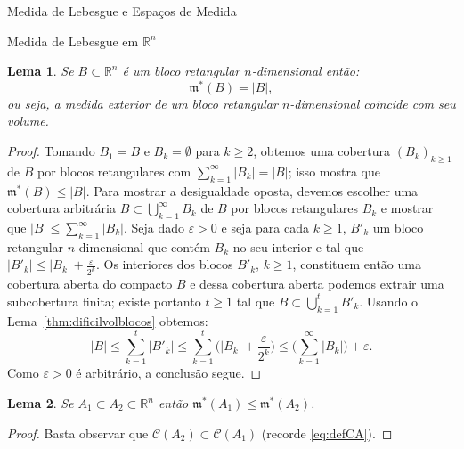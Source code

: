 \documentclass[oneside,final,11pt]{amsbook}
\newcommand{\R}{\mathds R}
\newcommand{\leb}{\mathfrak m}
\theoremstyle{remark}\newtheorem{exercise}{Exercício}[chapter]
\theoremstyle{remark}\newtheorem{*exercise}[exercise]{\hbox to 0pt{\hskip 0pt minus 1fil*}Exercício}
\theoremstyle{definition}\newtheorem{exdefin}{Definição}[chapter]
\theoremstyle{plain}\newtheorem{teo}{Teorema}[section]
\theoremstyle{plain}\newtheorem{lem}[teo]{Lema}
\theoremstyle{plain}\newtheorem{prop}[teo]{Proposição}
\theoremstyle{plain}\newtheorem{cor}[teo]{Corolário}
\theoremstyle{definition}\newtheorem{defin}[teo]{Definição}
\theoremstyle{remark}\newtheorem{rem}[teo]{Observação}
\theoremstyle{definition}\newtheorem{notation}[teo]{Notação}
\theoremstyle{definition}\newtheorem{convention}[teo]{Convenção}
\theoremstyle{definition}\newtheorem{example}[teo]{Exemplo}
\numberwithin{section}{chapter}
\numberwithin{equation}{section}
\begin{document}
\begin{chapter}{Medida de Lebesgue e Espaços de Medida}
\begin{section}[Medida de Lebesgue em $\R^n$]{Medida de Lebesgue em ${\R^n}$}
\begin{lem}\label{thm:medidabloco}
Se $B\subset\R^n$ é um bloco retangular $n$-dimensional então:
\[\leb^*(B)=\vert B\vert,\]
ou seja, a medida exterior de um bloco retangular $n$-dimensional coincide com seu volume.
\end{lem}
\begin{proof}
Tomando $B_1=B$ e $B_k=\emptyset$ para $k\ge2$, obtemos uma cobertura $(B_k)_{k\ge1}$ de $B$ por blocos retangulares
com $\sum_{k=1}^\infty\vert B_k\vert=\vert B\vert$;
isso mostra que $\leb^*(B)\le\vert B\vert$. Para mostrar a desigualdade oposta, devemos escolher uma cobertura arbitrária
$B\subset\bigcup_{k=1}^\infty B_k$ de $B$ por blocos retangulares $B_k$ e mostrar que $\vert B\vert\le\sum_{k=1}^\infty\vert B_k\vert$.
Seja dado $\varepsilon>0$ e seja para cada $k\ge1$, $B'_k$ um bloco retangular $n$-dimensional que contém $B_k$ no seu interior
e tal que $\vert B'_k\vert\le\vert B_k\vert+\frac\varepsilon{2^k}$. Os interiores dos blocos $B'_k$, $k\ge1$, constituem então
uma cobertura aberta do compacto $B$ e dessa cobertura aberta podemos extrair uma subcobertura finita; existe portanto
$t\ge1$ tal que $B\subset\bigcup_{k=1}^tB'_k$. Usando o Lema~\ref{thm:dificilvolblocos} obtemos:
\[\vert B\vert\le\sum_{k=1}^t\vert B'_k\vert\le\sum_{k=1}^t\Big(\vert B_k\vert+\frac\varepsilon{2^k}\Big)\le\Big(\sum_{k=1}^\infty\vert B_k\vert\Big)+\varepsilon.\]
Como $\varepsilon>0$ é arbitrário, a conclusão segue.
\end{proof}

\begin{lem}\label{thm:lebmonotonica}
Se $A_1\subset A_2\subset\R^n$ então $\leb^*(A_1)\le\leb^*(A_2)$.
\end{lem}
\begin{proof}
Basta observar que $\mathcal C(A_2)\subset\mathcal C(A_1)$ (recorde \eqref{eq:defCA}).
\end{proof}


\end{section}
\end{chapter}
\end{document}
